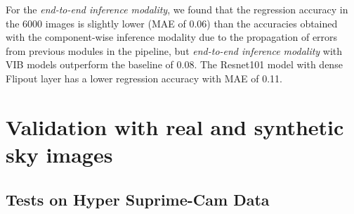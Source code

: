 \documentclass[12pt, twocolumn, apj]{openjournal}
\begin{document}
For the {\em end-to-end inference modality}, we found that the regression accuracy in the $6000$ images is slightly lower (MAE of $0.06$) than the accuracies obtained with the component-wise inference modality due to the propagation of errors from previous modules in the pipeline, but {\em end-to-end inference modality} with VIB models outperform the baseline of $0.08$. The Resnet101 model with dense Flipout layer has a lower regression accuracy with MAE of 0.11.

\section{Validation with real and synthetic sky images}

\subsection{Tests on Hyper Suprime-Cam Data}
\end{document}
